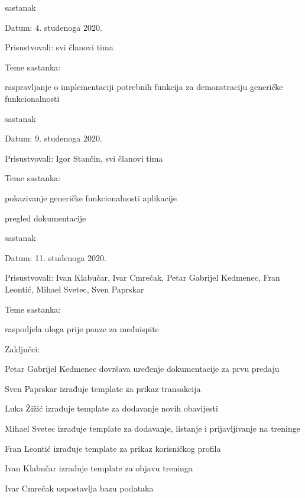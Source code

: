 \begin{packed_enum}
		\eject 
			\item  sastanak
			\item[] \begin{packed_item}
				\item Datum: 4. studenoga 2020. 
				\item Prisustvovali: svi članovi tima
				\item Teme sastanka:
				\begin{packed_item}
					\item  raspravljanje o implementaciji potrebnih funkcija za demonstraciju generičke funkcionalnosti
				\end{packed_item}
			\end{packed_item}
		
			\item  sastanak
			\item[] \begin{packed_item}
				\item Datum: 9. studenoga 2020. 
				\item Prisustvovali: Igor Stančin, svi članovi tima
				\item Teme sastanka:
				\begin{packed_item}
					\item pokazivanje generičke funkcionalnosti aplikacije
					\item pregled dokumentacije
				\end{packed_item}
			\end{packed_item}
			
			\item  sastanak
			\item[] \begin{packed_item}
				\item Datum: 11. studenoga 2020. 
				\item Prisustvovali: Ivan Klabučar, Ivar Cmrečak, Petar Gabrijel Kedmenec, Fran Leontić, Mihael Svetec, Sven Paprskar
				\item Teme sastanka:
				\begin{packed_item}
					\item raspodjela uloga prije pauze za međuispite
				\end{packed_item}
				\item Zaključci:
				\begin{packed_item}
					\item Petar Gabrijel Kedmenec dovršava uređenje dokumentacije za prvu predaju
					\item Sven Paprskar izrađuje template za prikaz transakcija
					\item Luka Žižić izrađuje template za dodavanje novih obavijesti
					\item Mihael Svetec izrađuje template za dodavanje, listanje i prijavljivanje na treninge
					\item Fran Leontić izrađuje template za prikaz korisničkog profila
					\item Ivan Klabučar izrađuje template za objavu treninga
					\item Ivar Cmrečak uspostavlja bazu podataka
				\end{packed_item}
			\end{packed_item}
			

\end{packed_enum}
